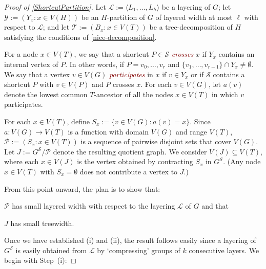 \documentclass{patmorin}
\theoremstyle{plain}
\theoremstyle{definition}
\newcommand{\defin}[1]{\textcolor{Maroon}{\emph{#1}}}
\newcommand{\note}[2]{\noindent{\color{red}[#1:~#2]}}
\newcommand{\referee}[2]{\noindent\textcolor{blue}{\framebox{\begin{minipage}{\textwidth} Ref \#{#1}: #2\end{minipage}}}}
\newcommand{\PP}{\mathcal{P}}
\renewcommand{\SS}{\mathcal{S}}
\begin{document}




\begin{proof}[Proof of \cref{ShortcutPartition}]
  Let $\mathcal{L}:=\langle L_1,\ldots,L_h\rangle$ be a layering of $G$; let $\mathcal{Y}:=(Y_x: x\in V(H))$ be an $H$-partition of $G$ of layered width at most $\ell$ with respect to $\mathcal{L}$; and let $\mathcal{T}:=(B_x:x\in V(T))$ be a tree-decomposition of $H$ satisfying the conditions of \cref{nice-decomposition}.

For a node $x\in V(T)$, we say that a shortcut $P\in\SS$ \defin{crosses} $x$ if $Y_x$ contains an internal vertex of $P$.  In other words, if $P=v_0,\ldots,v_r$ and $\{v_1,\ldots,v_{r-1}\}\cap Y_x\neq\emptyset$.  We say that a vertex $v\in V(G)$ \defin{participates} in $x$ if $v\in Y_x$ or if $\SS$ contains a shortcut $P$ with $v\in V(P)$ and $P$ crosses $x$.  For each $v\in V(G)$, let $a(v)$ denote the lowest common $T$-ancestor of all the nodes $x\in V(T)$ in which $v$ participates.

For each $x\in V(T)$, define $S_x := \{v\in V(G): a(v)= x\}$. Since $a:V(G)\to V(T)$ is a function with domain $V(G)$ and range $V(T)$, $\PP:=(S_x : x\in V(T))$ is a sequence of pairwise disjoint sets that cover $V(G)$. Let $J:=G^\SS/\PP$ denote the resulting quotient graph. We consider $V(J)\subseteq V(T)$, where each $x\in V(J)$ is the vertex obtained by contracting $S_x$ in $G^{\SS}$. (Any node $x\in V(T)$ with $S_x=\emptyset$ does not contribute a vertex to $J$.)

From this point onward, the plan is to show that:
\begin{compactenum}[(i)]
  \item $\PP$ has small layered width with respect to the layering $\mathcal{L}$ of $G$ and that
  \item $J$ has small treewidth.
\end{compactenum}
Once we have established (i) and (ii), the result follows easily since a layering of $G^\SS$ is easily obtained from $\mathcal{L}$ by `compressing' groups of $k$ consecutive layers.  We begin with Step~(i):


\end{proof}
\end{document}
